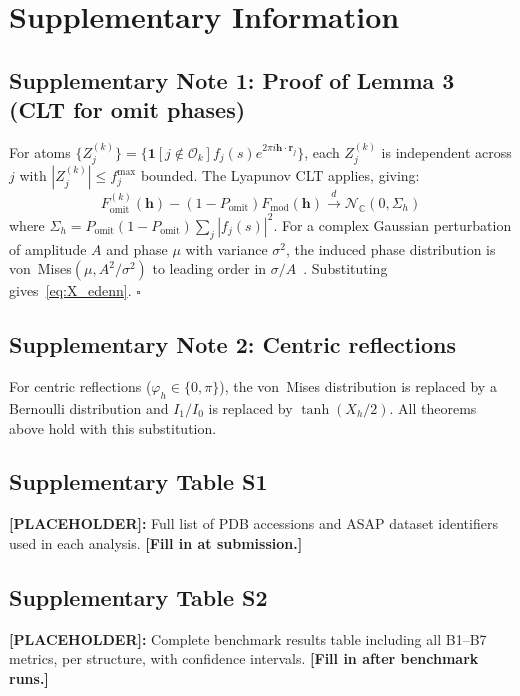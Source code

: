 \documentclass[10pt,twocolumn]{article}
\newcommand{\placeholder}[1]{%
  \begin{mdframed}[
    linecolor=placeholder,linewidth=1pt,
    backgroundcolor=red!5,
    innertopmargin=6pt,innerbottommargin=6pt,
    innerleftmargin=8pt,innerrightmargin=8pt]
  \small\color{placeholder}\textbf{[PLACEHOLDER]:} #1
  \end{mdframed}
}
\newcommand{\Fmod}{F_{\!\mathrm{mod}}}
\newcommand{\phih}{\varphi_h}
\newcommand{\Xh}{X_h}
\newcommand{\boldh}{\mathbf{h}}
\newcommand{\boldr}{\mathbf{r}}
\begin{document}
\section*{Supplementary Information}

\subsection*{Supplementary Note 1: Proof of Lemma 3
(CLT for omit phases)}

For atoms $\{Z_j^{(k)}\} = \{\mathbf{1}[j\notin\mathcal{O}_k]
f_j(s)e^{2\pi i\boldh\cdot\boldr_j}\}$, each $Z_j^{(k)}$ is
independent across $j$ with $|Z_j^{(k)}| \leq f_j^{\max}$
bounded.  The Lyapunov CLT applies, giving:
\begin{equation*}
  F_{\mathrm{omit}}^{(k)}(\boldh)
  - (1-P_{\mathrm{omit}})\Fmod(\boldh)
  \xrightarrow{d} \mathcal{N}_\mathbb{C}(0,\Sigma_h)
\end{equation*}
where $\Sigma_h = P_{\mathrm{omit}}(1-P_{\mathrm{omit}})
\sum_j|f_j(s)|^2$.
For a complex Gaussian perturbation of amplitude $A$ and phase
$\mu$ with variance $\sigma^2$, the induced phase distribution
is von~Mises$(\mu, A^2/\sigma^2)$ to leading order in
$\sigma/A$~\cite{mardia2000}.
Substituting gives~\eqref{eq:X_edenn}. $\square$

\subsection*{Supplementary Note 2: Centric reflections}

For centric reflections ($\phih \in \{0,\pi\}$), the von~Mises
distribution is replaced by a Bernoulli distribution and
$I_1/I_0$ is replaced by $\tanh(\Xh/2)$.
All theorems above hold with this substitution.

\subsection*{Supplementary Table S1}

\placeholder{
Full list of PDB accessions and ASAP dataset identifiers used
in each analysis.
\textbf{[Fill in at submission.]}
}

\subsection*{Supplementary Table S2}

\placeholder{
Complete benchmark results table including all B1--B7 metrics,
per structure, with confidence intervals.
\textbf{[Fill in after benchmark runs.]}
}
\end{document}
